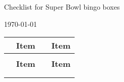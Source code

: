 \documentclass[12pt]{article}
\newcommand{\sep}{1mm}
\newcommand{\negsep}{-3mm}
\begin{document}
\begin{Form}


\begin{center}
\begin{Large}
Checklist for Super Bowl bingo boxes
\end{Large}
\vspace{0.15in}



\today

\end{center}

    \begin{longtable}{l L{2.75in} l L{2.75in}}

        & \textbf{Item} && \textbf{Item} \\[\sep]
\hline\\[\negsep]
\endfirsthead

        & \textbf{Item} && \textbf{Item} \\[\sep]
\hline\\[\negsep]
\endhead

\hline\hline
\endfoot



\end{longtable}
\end{Form}
\end{document}
